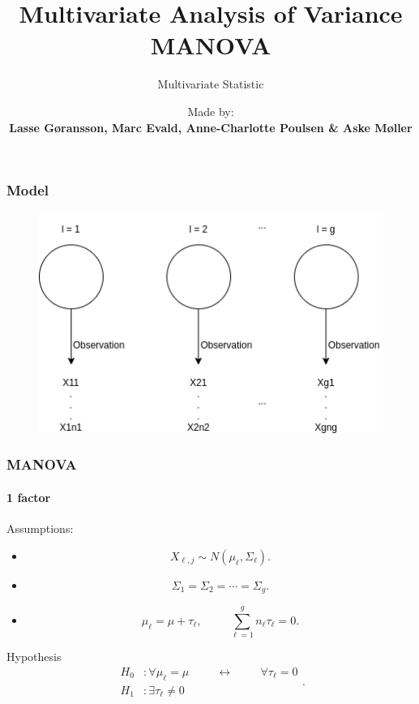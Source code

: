 \documentclass[aspectratio=169,10pt,t]{beamer}
\title{Multivariate Analysis of Variance MANOVA}
\subtitle{Multivariate Statistic}
\date{ }
\author{
	Made by: \\
	\textbf{Lasse Gøransson, Marc Evald, Anne-Charlotte Poulsen \& Aske Møller}
}
\institute[
  SDU Robotics\\
  The Maersk Mc-Kinney Moller Institute\\
  University of Southern Denmark
] %
{%
  SDU Robotics\\
  The Maersk Mc-Kinney Moller Institute\\
  University of Southern Denmark

}
\begin{document}
{\SDUwavesbg%
\begin{frame} %
  \titlepage
\end{frame}}

\begin{frame}[t]
    \frametitle{Model}
    \begin{figure}[H]
    \includegraphics[scale=0.5]{images/modelManoca.png}
    \end{figure}
\end{frame}

\begin{frame}[t]
	\frametitle{MANOVA}
	\framesubtitle{1 factor}

	Assumptions:
	\begin{itemize}
	\item 
	\[
		X_{\ell,j} \sim N \left( \mu_\ell , \Sigma_\ell  \right) 
	.\] 
	\item 
		\[
			\Sigma_1 = \Sigma_2 = \cdots = \Sigma_g
		.\] 
	\item 
		\[
			\mu_\ell = \mu + \tau_\ell, \hspace{1cm} \sum^{g}_{\ell = 1} n_{\ell}\tau_{\ell}=0
		.\] 
	\end{itemize}
	Hypothesis
	\[
	\begin{aligned}
		H_0 &: \forall \mu_\ell = \mu \hspace{1cm} \leftrightarrow 
		\hspace{1cm} \forall \tau_\ell = 0\\
		H_1 &: \exists \tau_\ell \neq 0
	\end{aligned}
	.\] 

\end{frame}
\end{document}
